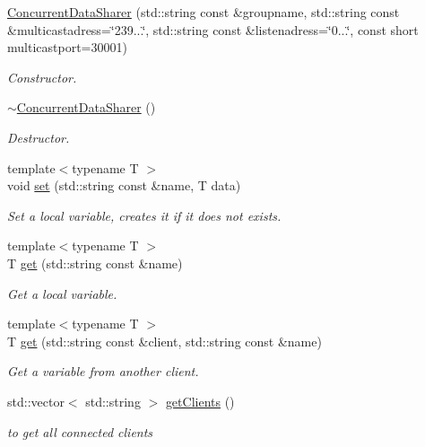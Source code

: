 \begin{DoxyCompactItemize}
\item 
\hyperlink{classConcurrentDataSharer_a31adaa38a46a75059bc117aa3b889ead}{Concurrent\+Data\+Sharer} (std\+::string const \&groupname, std\+::string const \&multicastadress=\char`\"{}239...\char`\"{}, std\+::string const \&listenadress=\char`\"{}0...\char`\"{}, const short multicastport=30001)
\begin{DoxyCompactList}\small\item\em Constructor. \end{DoxyCompactList}\item 
\hyperlink{classConcurrentDataSharer_abfb5ed7099ae718277bdbfeef362c8c9}{$\sim$\+Concurrent\+Data\+Sharer} ()
\begin{DoxyCompactList}\small\item\em Destructor. \end{DoxyCompactList}\item 
{\footnotesize template$<$typename T $>$ }\\void \hyperlink{classConcurrentDataSharer_a61da465e07a98d3b35d5f646d6ebaa33}{set} (std\+::string const \&name, T data)
\begin{DoxyCompactList}\small\item\em Set a local variable, creates it if it does not exists. \end{DoxyCompactList}\item 
{\footnotesize template$<$typename T $>$ }\\T \hyperlink{classConcurrentDataSharer_ab843e7ba2687921eee926d5ec3251ec2}{get} (std\+::string const \&name)
\begin{DoxyCompactList}\small\item\em Get a local variable. \end{DoxyCompactList}\item 
{\footnotesize template$<$typename T $>$ }\\T \hyperlink{classConcurrentDataSharer_a00a171243dde5f2b957f8e338d2fb4cd}{get} (std\+::string const \&client, std\+::string const \&name)
\begin{DoxyCompactList}\small\item\em Get a variable from another client. \end{DoxyCompactList}\item 
std\+::vector$<$ std\+::string $>$ \hyperlink{classConcurrentDataSharer_a10ac5344381b73c61368634efcff7350}{get\+Clients} ()
\begin{DoxyCompactList}\small\item\em to get all connected clients \end{DoxyCompactList}\item 

\end{DoxyCompactItemize}
